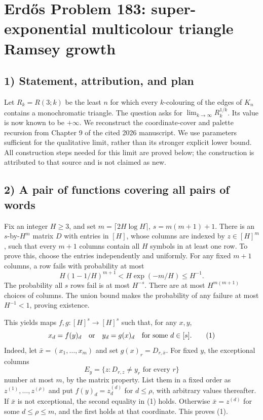 \section{Erd\H{o}s Problem 183: super-exponential multicolour triangle Ramsey growth}

\subsection{1) Statement, attribution, and plan}
Let $R_k=R(3;k)$ be the least $n$ for which every $k$-colouring of
the edges of $K_n$ contains a monochromatic triangle. The question asks
for $\lim_{k\to\infty}R_k^{1/k}$. Its value is now known to be $+\infty$.
We reconstruct the coordinate-cover and palette recursion from Chapter 9
of the cited 2026 manuscript. We use parameters sufficient for the
qualitative limit, rather than its stronger explicit lower bound.
All construction steps needed for this limit are proved below; the
construction is attributed to that source and is not claimed as new.

\subsection{2) A pair of functions covering all pairs of words}
Fix an integer $H\geq3$, and set
$m=\lceil2H\log H\rceil$, $s=m(m+1)+1$.
There is an $s$-by-$H^m$ matrix $D$ with entries in $[H]$, whose columns
are indexed by $z\in[H]^m$, such that every $m+1$ columns contain all
$H$ symbols in at least one row. To prove this, choose the entries
independently and uniformly. For any fixed $m+1$ columns, a row fails
with probability at most
\[
 H(1-1/H)^{m+1}<H\exp(-m/H)\leq H^{-1}.
\]
The probability all $s$ rows fail is at most $H^{-s}$. There are at
most $H^{m(m+1)}$ choices of columns. The union bound makes the
probability of any failure at most $H^{-1}<1$, proving existence.

This yields maps $f,g:[H]^s\to[H]^s$ such that, for any $x,y$,
\[
 x_d=f(y)_d\quad\hbox{or}\quad y_d=g(x)_d
 \quad\hbox{for some }d\in[s].                         \tag{1}
\]
Indeed, let $\bar x=(x_1,\ldots,x_m)$ and set $g(x)_r=D_{r,\bar x}$.
For fixed $y$, the exceptional columns
\[
 E_y=\{z:D_{r,z}\ne y_r\text{ for every }r\}
\]
number at most $m$, by the matrix property. List them in a fixed order
as $z^{(1)},\ldots,z^{(\rho)}$ and put
$f(y)_d=z^{(d)}_d$ for $d\leq\rho$, with arbitrary values thereafter.
If $\bar x$ is not exceptional, the second equality in (1) holds.
Otherwise $\bar x=z^{(d)}$ for some $d\leq\rho\leq m$, and the first
holds at that coordinate. This proves (1).

